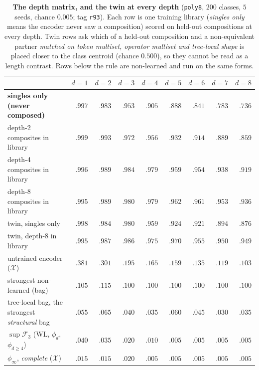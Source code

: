 \begin{table}[h]
\centering
\begin{threeparttable}
\footnotesize
\caption{\textbf{The depth matrix, and the twin at every depth} (\texttt{poly8}, $200$ classes, $5$ seeds, chance $0.005$; tag \texttt{r93}). Each row is one training library (\emph{singles only} means the encoder never saw a composition) scored on held-out compositions at every depth. Twin rows ask which of a held-out composition and a non-equivalent partner \emph{matched on token multiset, operator multiset and tree-local shape} is placed closer to the class centroid (chance $0.500$), so they cannot be read as a length contrast. Rows below the rule are non-learned and run on the same forms.}
\label{tab:deep_composition}
\small
\begin{tabular}{l rrrrrrrr}
\toprule
& $d{=}1$ & $d{=}2$ & $d{=}3$ & $d{=}4$ & $d{=}5$ & $d{=}6$ & $d{=}7$ & $d{=}8$ \\
\midrule
\textbf{singles only (never composed)} & $.997$ & $.983$ & $.953$ & $.905$ & $.888$ & $.841$ & $.783$ & $\mathbf{.736}$ \\
depth-2 composites in library & $.999$ & $.993$ & $.972$ & $.956$ & $.932$ & $.914$ & $.889$ & $.859$ \\
depth-4 composites in library & $.996$ & $.989$ & $.984$ & $.979$ & $.959$ & $.954$ & $.938$ & $.919$ \\
depth-8 composites in library & $.995$ & $.989$ & $.980$ & $.979$ & $.962$ & $.961$ & $.953$ & $\mathbf{.936}$ \\
\midrule
twin, singles only & $.998$ & $.984$ & $.980$ & $.959$ & $.924$ & $.921$ & $.894$ & $\mathbf{.876}$ \\
twin, depth-8 in library & $.995$ & $.987$ & $.986$ & $.975$ & $.970$ & $.955$ & $.950$ & $.949$ \\
\midrule
untrained encoder \;($\mathcal{X}$) & $.381$ & $.301$ & $.195$ & $.165$ & $.159$ & $.135$ & $.119$ & $.103$ \\
strongest non-learned (bag) & $.105$ & $.115$ & $.100$ & $.100$ & $.100$ & $.100$ & $.100$ & $.100$ \\
tree-local bag, the strongest \emph{structural} bag & $.055$ & $.065$ & $.040$ & $.035$ & $.060$ & $.045$ & $.030$ & $.035$ \\
$\sup\mathcal{F}_3$ (WL, $\phi_d$, $\phi_{d\geq4}$) & $.040$ & $.035$ & $.020$ & $.010$ & $.005$ & $.005$ & $.005$ & $.005$ \\
$\phi_\infty$, \emph{complete} \;($\mathcal{X}$) & $.015$ & $.015$ & $.020$ & $.005$ & $.005$ & $.005$ & $.005$ & $.005$ \\
\bottomrule
\end{tabular}
\end{threeparttable}
\end{table}

